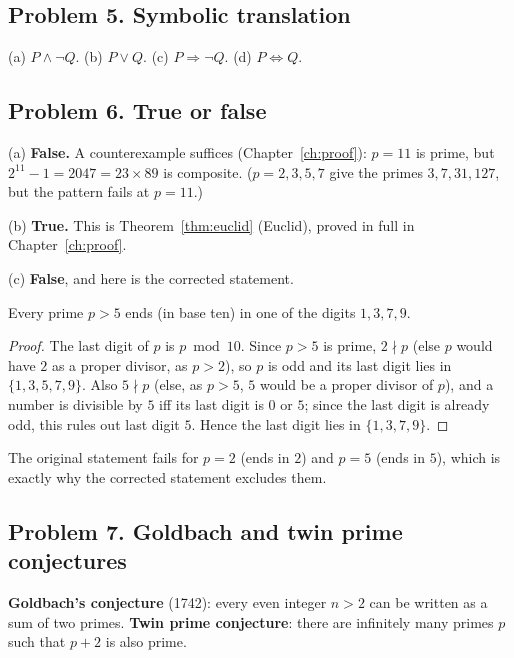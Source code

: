 \subsection*{Problem 5. Symbolic translation}
(a) $P\wedge\neg Q$. (b) $P\vee Q$. (c) $P\Rightarrow\neg Q$. (d) $P\Leftrightarrow Q$.

\subsection*{Problem 6. True or false}

(a) \textbf{False.} A counterexample suffices (Chapter~\ref{ch:proof}): $p=11$ is prime, but $2^{11}-1=2047=23\times89$ is composite. ($p=2,3,5,7$ give the primes $3,7,31,127$, but the pattern fails at $p=11$.)

(b) \textbf{True.} This is Theorem~\ref{thm:euclid} (Euclid), proved in full in Chapter~\ref{ch:proof}.

(c) \textbf{False}, and here is the corrected statement.

\begin{proposition}
	Every prime $p>5$ ends (in base ten) in one of the digits $1,3,7,9$.
\end{proposition}
\begin{proof}
	The last digit of $p$ is $p\bmod10$. Since $p>5$ is prime, $2\nmid p$ (else $p$ would have $2$ as a proper divisor, as $p>2$), so $p$ is odd and its last digit lies in $\{1,3,5,7,9\}$. Also $5\nmid p$ (else, as $p>5$, $5$ would be a proper divisor of $p$), and a number is divisible by $5$ iff its last digit is $0$ or $5$; since the last digit is already odd, this rules out last digit $5$. Hence the last digit lies in $\{1,3,7,9\}$.
\end{proof}
The original statement fails for $p=2$ (ends in $2$) and $p=5$ (ends in $5$), which is exactly why the corrected statement excludes them.

\subsection*{Problem 7. Goldbach and twin prime conjectures}

\textbf{Goldbach's conjecture} (1742): every even integer $n>2$ can be written as a sum of two primes. \textbf{Twin prime conjecture}: there are infinitely many primes $p$ such that $p+2$ is also prime.

